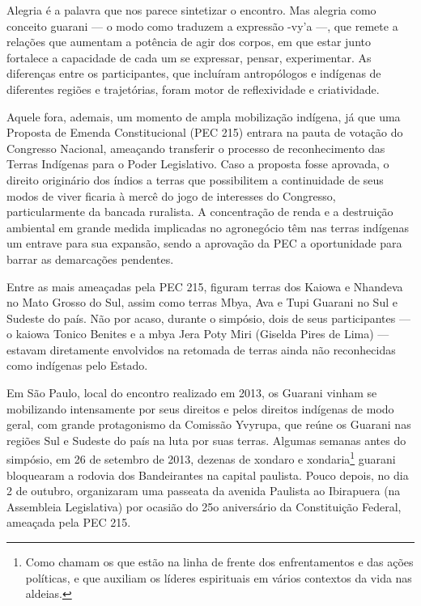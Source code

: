 \documentclass{article}
\begin{document}
Alegria \'e a palavra que nos parece sintetizar o encontro. Mas alegria
como conceito guarani --- o modo como traduzem a express\~ao
-vy{\textquoteright}a ---, que remete a rela\c{c}\~oes que aumentam a
pot\^encia de agir dos corpos, em que estar junto fortalece a
capacidade de cada um se expressar, pensar, experimentar. As
diferen\c{c}as entre os participantes, que inclu\'iram antrop\'ologos e
ind\'igenas de diferentes regi\~oes e trajet\'orias, foram motor de
reflexividade e criatividade.

Aquele fora, ademais, um momento de ampla mobiliza\c{c}\~ao ind\'igena,
j\'a que uma Proposta de Emenda Constitucional (PEC 215) entrara na
pauta de vota\c{c}\~ao do Congresso Nacional, amea\c{c}ando transferir
o processo de reconhecimento das Terras Ind\'igenas para o Poder
Legislativo. Caso a proposta fosse aprovada, o direito origin\'ario dos
\'indios a terras que possibilitem a continuidade de seus modos de
viver ficaria \`a merc\^e do jogo de interesses do Congresso,
particularmente da bancada ruralista. A concentra\c{c}\~ao de renda e a
destrui\c{c}\~ao ambiental em grande medida implicadas no agroneg\'ocio
t\^em nas terras ind\'igenas um entrave para sua expans\~ao, sendo a
aprova\c{c}\~ao da PEC a oportunidade para barrar as demarca\c{c}\~oes
pendentes.

Entre as mais amea\c{c}adas pela PEC 215, figuram terras dos Kaiowa e
Nhandeva no Mato Grosso do Sul, assim como terras Mbya, Ava e Tupi
Guarani no Sul e Sudeste do pa\'is. N\~ao por acaso, durante o
simp\'osio, dois de seus participantes --- o kaiowa Tonico Benites e a
mbya Jera Poty Miri (Giselda Pires de Lima) --- estavam diretamente
envolvidos na retomada de terras ainda n\~ao reconhecidas como
ind\'igenas pelo Estado. 

Em S\~ao Paulo, local do encontro realizado em 2013, os Guarani vinham
se mobilizando intensamente por seus direitos e pelos direitos
ind\'igenas de modo geral, com grande protagonismo da Comiss\~ao
Yvyrupa, que re\'une os Guarani nas regi\~oes Sul e Sudeste do pa\'is
na luta por suas terras. Algumas semanas antes do simp\'osio, em 26 de
setembro de 2013, dezenas de xondaro e xondaria\footnote{  Como chamam
os que est\~ao na linha de frente dos enfrentamentos e das a\c{c}\~oes
pol\'iticas, e que auxiliam os l\'ideres espirituais em v\'arios
contextos da vida nas aldeias.} guarani bloquearam a rodovia dos
Bandeirantes na capital paulista. Pouco depois, no dia 2 de outubro,
organizaram uma passeata da avenida Paulista ao Ibirapuera (na
Assembleia Legislativa) por ocasi\~ao do 25o anivers\'ario da
Constitui\c{c}\~ao Federal, amea\c{c}ada pela PEC 215. 
\end{document}
